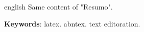 \begin{resumo}[Abstract]
 \begin{otherlanguage*}{english}
   Same content of "Resumo".

   \vspace{\onelineskip}

   \noindent
   \textbf{Keywords}: latex. abntex. text editoration.
 \end{otherlanguage*}
\end{resumo}

%
%
%

\listoffigures*
\cleardoublepage

\listofquadros*
\cleardoublepage

\listoftables*
\cleardoublepage


\printglossary[type=\acronymtype,title={Lista de abreviaturas e siglas}]
\cleardoublepage


\printglossary[type=simbolos,title={Lista de símbolos}]
\cleardoublepage

\tableofcontents*
\cleardoublepage



\textual

